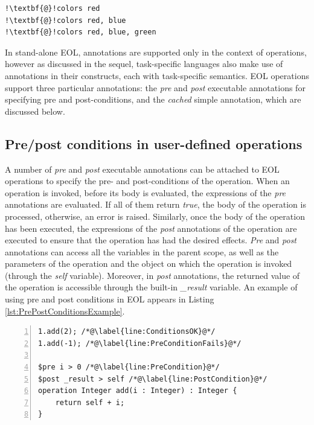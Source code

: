 \begin{lstlisting}[basicstyle=\ttfamily\footnotesize, flexiblecolumns=true, numbers=none, nolol=true, caption=Examples of simple annotations, label=lst:SimpleAnnotationsExamples, language=EOL, tabsize=2, escapechar=!]
!\textbf{@}!colors red
!\textbf{@}!colors red, blue
!\textbf{@}!colors red, blue, green
\end{lstlisting}

In stand-alone EOL, annotations are supported only in the context of operations, however as discussed in the sequel, task-specific languages also make use of annotations in their constructs, each with task-specific semantics. EOL operations support three particular annotations: the \emph{pre} and \emph{post} executable annotations for specifying pre and post-conditions, and the \emph{cached} simple annotation, which are discussed below.

\subsection{Pre/post conditions in user-defined operations}
\label{sec:prep-cond-user}

A number of \emph{pre} and \emph{post} executable annotations can be attached to EOL operations to specify the pre- and post-conditions of the operation. When an operation is invoked, before its body is evaluated, the expressions of the \emph{pre} annotations are evaluated. If all of them return \emph{true}, the body of the operation is processed, otherwise, an error is raised. Similarly, once the body of the operation has been executed, the expressions of the \emph{post} annotations of the operation are executed to ensure that the operation has had the desired effects. \emph{Pre} and \emph{post} annotations can access all the variables in the parent scope, as well as the parameters of the operation and the object on which the operation is invoked (through the \emph{self} variable). Moreover, in \emph{post} annotations, the returned value of the operation is accessible through the built-in \emph{\_result} variable. An example of using pre and post conditions in EOL appears in Listing \ref{lst:PrePostConditionsExample}.

\begin{lstlisting}[basicstyle=\ttfamily\footnotesize, flexiblecolumns=true, numbers=left, nolol=true, caption=Example of pre- and post-conditions in an EOL operation, label=lst:PrePostConditionsExample, language=EOL, tabsize=2]
1.add(2); /*@\label{line:ConditionsOK}@*/
1.add(-1); /*@\label{line:PreConditionFails}@*/

$pre i > 0 /*@\label{line:PreCondition}@*/
$post _result > self /*@\label{line:PostCondition}@*/
operation Integer add(i : Integer) : Integer {
	return self + i;
}
\end{lstlisting}

